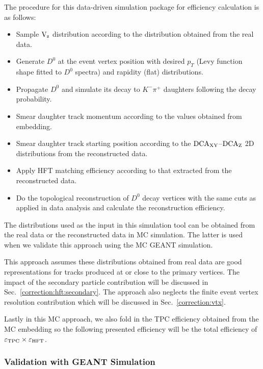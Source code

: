 \documentclass[%
 reprint,	
 amsmath,amssymb,
 aps,
 prc,
]{revtex4-1}
\begin{document}
The procedure for this data-driven simulation package for efficiency calculation is as follows:

\begin{itemize}
\item Sample $\textup{V}_\textup{z}$ distribution according to the distribution obtained from the real data.
\item Generate $D^0$ at the event vertex position with desired $p_T$ (Levy function shape fitted to $D^0$ spectra) and rapidity (flat) distributions.
\item Propagate $D^0$ and simulate its decay to $K^-\pi^+$ daughters following the decay probability.
\item Smear daughter track momentum according to the values obtained from embedding.
\item Smear daughter track starting position according to the $\textup{DCA}_{\textup{XY}}$--$\textup{DCA}_\textup{Z}$ 2D distributions from the reconstructed data.
\item Apply HFT matching efficiency according to that extracted from the reconstructed data.
\item Do the topological reconstruction of $D^0$ decay vertices with the same cuts as applied in data analysis and calculate the reconstruction efficiency.
\end{itemize}
The distributions used as the input in this simulation tool can be obtained from the real data or the reconstructed data in MC simulation. The latter is used when we validate this approach using the MC GEANT simulation. 

This approach assumes these distributions obtained from real data are good representations for tracks produced at or close to the primary vertices. The impact of the secondary particle contribution will be discussed in Sec.~\ref{correction:hft:secondary}. The approach also neglects the finite event vertex resolution contribution which will be discussed in Sec.~\ref{correction:vtx}.

Lastly in this MC approach, we also fold in the TPC efficiency obtained from the MC embedding so the following presented efficiency will be the total efficiency of $\varepsilon_{\rm TPC}\times\varepsilon_{\rm HFT}$.

\subsubsection{Validation with GEANT Simulation}
\label{correction:hft:validation}
\end{document}
